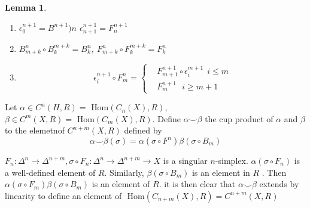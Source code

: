 \documentclass[11pt]{article}
\newtheorem{lemma}[thm]{Lemma}
\renewcommand{\hom}{\text{ Hom}}
\newcommand{\lrta}{\longrightarrow}
\begin{document}
\begin{lemma}
\ \begin{enumerate}
 \item $\epsilon^{n+1}_0=B^{n+1})n$ $\epsilon^{n+1}_{n+1}=F^{n+1}_n$
 \item $B^n_{m+k}\circ B^{m+k}_k=B^n_k$, $F^n_{m+k}\circ F^{m+k}_k=F^n_k$
 \item 
 $$
\epsilon^{n+1}_{i}\circ F_m^n=\left\{\begin{aligned}
&F^{n+1}_{m+1}\circ \epsilon^{m+1}_i \ \  i\leq m\\
&F^{n+1}_m\ \ \   i\geq m+1
\end{aligned}\right.
 $$

\end{enumerate}
\end{lemma}


 Let $\alpha\in C^n(H,R)=\hom(C_n(X),R)$, $\beta\in C^m(X,R)=\hom(C_m(X),R)$. 
 Define $\alpha\smile \beta$ the cup product of $\alpha$ and $\beta$ to the elemetnof $C^{n+m}(X,R)$ defined by 
 $$
\alpha\smile\beta(\sigma)=\alpha(\sigma\circ F^n)\beta(\sigma\circ B_m)
 $$

 $F_n:\Delta^n\lrta \Delta^{n+m}, \sigma\circ F_n: \Delta^n\lrta \Delta^{n+m}\lrta X$ is a singular $n$-simplex. $\alpha(\sigma\circ F_n)$ is a well-defined element of $R$. Similarly, $\beta(\sigma\circ B_m)$ is an element in $R$ . Then $\alpha(\sigma\circ F_m)\beta(\sigma\circ B_m)$ is an element of $R$. it is then clear that  $\alpha\smile\beta$ extends by linearity to define an element of $\hom(C_{n+m}(X),R)=C^{n+m}(X,R)$
\end{document}
